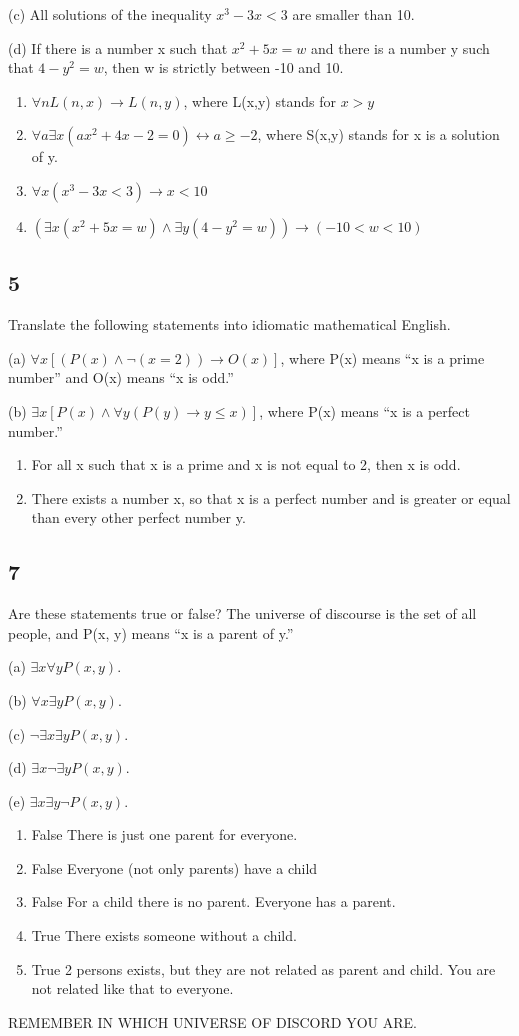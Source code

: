 \documentclass{article}
\begin{document}
(c) All solutions of the inequality $x^3- 3x < 3$ are smaller than 10.
 
(d) If there is a number x such that $x^2 + 5x = w$ and there is a number y
such that $4 - y^2= w$, then w is strictly between -10 and 10.
\begin{enumerate}[label=(\alph*)]
    \item 
$\forall n L(n,x)\rightarrow L(n,y)$, where L(x,y) stands for $x>y$
    \item
$\forall a \exists x (ax^2 + 4x - 2 = 0) \leftrightarrow a \geq -2$, where S(x,y) stands for x is a solution of y.
    \item
$\forall x (x^3- 3x < 3)\rightarrow x<10$
    \item
$(\exists x (x^2 + 5x = w) \land \exists y (4 - y^2= w))\rightarrow (-10<w<10)$
\end{enumerate}
\subsection{5}
Translate the following statements into idiomatic mathematical
English.

(a) $\forall x[(P(x) \land \neg(x= 2)) \rightarrow O(x)]$, where P(x) means “x is a prime
number” and O(x) means “x is odd.”

(b) $\exists x[P(x) \land \forall y(P(y) \rightarrow y \leq x)]$, where P(x) means “x is a perfect
number.”
\begin{enumerate}[label=(\alph*)]
    \item 
For all x such that x is a prime and x is not equal to 2, then x is odd.
    \item
There exists a number x, so that x is a perfect number and is greater or equal than every other perfect number y.
\end{enumerate}
\subsection{7}
Are these statements true or false? The universe of discourse is the set
of all people, and P(x, y) means “x is a parent of y.”

(a) $\exists x \forall yP(x, y)$.

(b) $\forall x \exists yP(x, y)$.

(c) $\neg \exists x \exists yP(x, y)$.

(d) $\exists x\neg \exists yP(x, y)$.

(e) $\exists x\exists y \neg P(x, y)$.
\begin{enumerate}[label=(\alph*)]
    \item
    False There is just one parent for everyone.
    \item
    False Everyone (not only parents) have a child
    \item
    False For a child there is no parent. Everyone has a parent.
    \item
    True There exists someone without a child.
    \item
    True 2 persons exists, but they are not related as parent and child. You are not related like that to everyone.


\end{enumerate}
REMEMBER IN WHICH UNIVERSE OF DISCORD YOU ARE.
\end{document}
